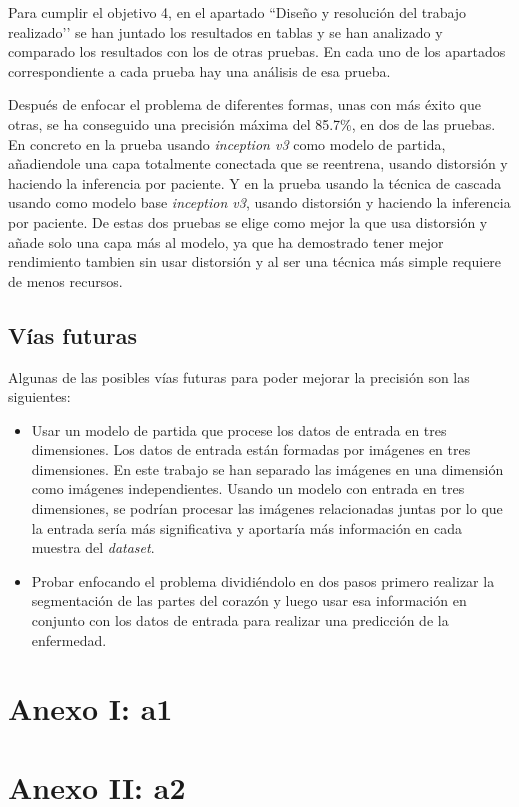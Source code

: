 \documentclass[12pt,a4paper]{article}
\begin{document}
Para cumplir el objetivo 4, en el apartado ``Diseño y resolución del trabajo realizado’’ se han juntado los resultados en tablas y se han analizado y comparado los resultados con los de otras pruebas. En cada uno de los apartados correspondiente a cada prueba hay una análisis de esa prueba.
\bigskip

Después de enfocar el problema de diferentes formas, unas con más éxito que otras, se ha conseguido una precisión máxima del 85.7\%, en dos de las pruebas. En concreto en la prueba usando \textit{inception v3} como modelo de partida, añadiendole una capa totalmente conectada que se reentrena, usando distorsión y haciendo la inferencia por paciente. Y en la prueba usando la técnica de cascada usando como modelo base \textit{inception v3}, usando distorsión y haciendo la inferencia por paciente. De estas dos pruebas se elige como mejor la que usa distorsión y añade solo una capa más al modelo, ya que ha demostrado tener mejor rendimiento tambien sin usar distorsión y al ser una técnica más simple requiere de menos recursos.

\subsection{Vías futuras}
Algunas de las posibles vías futuras para poder mejorar la precisión son las siguientes:

\begin{itemize}
\item Usar un modelo de partida que procese los datos de entrada en tres dimensiones. Los datos de entrada están formadas por imágenes en tres dimensiones. En este trabajo se han separado las imágenes en una dimensión como imágenes independientes. Usando un modelo con entrada en tres dimensiones, se podrían procesar las imágenes relacionadas juntas por lo que la entrada sería más significativa y aportaría más información en cada muestra del \textit{dataset}.

\item Probar enfocando el problema dividiéndolo en dos pasos primero realizar la segmentación de las partes del corazón y luego usar esa información en conjunto con los datos de entrada para realizar una predicción de la enfermedad.
\end{itemize}


\newpage
\appendix
\addappheadtotoc
\appendixpage
\section{Anexo I: a1}\label{anexo1}

\newpage
\section{Anexo II: a2}\label{anexo2}

\newpage
\nocite{*}
\renewcommand\refname{Bibliografía}



\clearpage


\printglossary[type=\acronymtype,style=long,title={Índice de acrónimos}]

\end{document}
